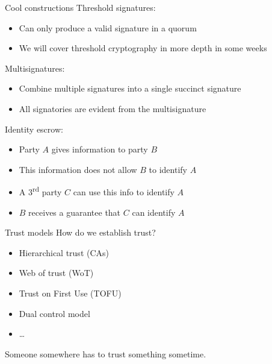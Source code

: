 \begin{frame}{Cool constructions}
  \pause
  Threshold signatures:
  \begin{itemize}
    \item Can only produce a valid signature in a quorum
    \item We will cover threshold cryptography in more depth in some weeks
  \end{itemize}

  \pause
  Multisignatures:
  \begin{itemize}
    \item Combine multiple signatures into a single succinct signature
    \item All signatories are evident from the multisignature
  \end{itemize}

  \pause
  Identity escrow:
  \begin{itemize}
    \item Party $A$ gives information to party $B$
    \item This information does not allow $B$ to identify $A$
    \item A 3\textsuperscript{rd} party $C$ can use this info to identify $A$
    \item $B$ receives a guarantee that $C$ can identify $A$
  \end{itemize}
\end{frame}

\begin{frame}{Trust models}
  How do we establish trust?
  \begin{itemize}[<+(1)->]
    \item Hierarchical trust (CAs)
    \item Web of trust (WoT)
    \item Trust on First Use (TOFU)
    \item Dual control model
    \item \dots
  \end{itemize}

  \pause
  Someone somewhere has to trust something sometime.
\end{frame}

